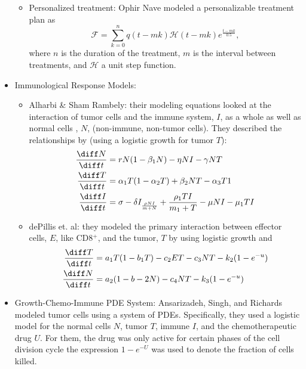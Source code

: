 \documentclass[11pt]{amsart}
\begin{document}
\begin{itemize}
\begin{itemize}
			\item Personalized treatment: Ophir Nave modeled a personalizable treatment plan as 
				\begin{equation}
					\mathscr{F} = \sum_{k=0}^n q(t-mk) \mathscr{H} (t-mk)e^{\frac{t-mk}{0.5}}\label{eq: NavePersonalChemo},
				\end{equation}
				where $n$ is the duration of the treatment, $m$ is the interval between treatments, and $\mathscr{H}$ a unit step function.
		\end{itemize}
	\item Immunological Response Models:
		\begin{itemize}
			\item Alharbi \& Sham Rambely: their modeling equations looked at the interaction of tumor cells and the immune system, $I$, as a whole as well as normal cells , $N$, (non-immune, non-tumor cells). They described the relationships by (using a logistic growth for tumor $T$):
				\begin{eqnarray}
					\begin{aligned}
						\frac{\diff N}{\diff t} &= rN(1-\beta_1 N) - \eta NI - \gamma NT \\
						\frac{\diff T}{\diff t} &= \alpha_1T(1-\alpha_2T) + \beta_2 NT - \alpha_3 T1 \\
						\frac{\diff I}{\diff t} &= \sigma - \delta I _ \frac{\rho N I}{m+N} + \frac{\rho_1 TI}{m_1 + T} - \mu NI - \mu_1 TI \label{eq: AlharbiTumorImmuno}
					\end{aligned}
				\end{eqnarray}
			\item dePillis et. al: they modeled the primary interaction between effector cells, $E$, like CD8$^+$, and the tumor, $T$ by using logistic growth and 
				\begin{eqnarray}
					\begin{aligned}
						\frac{\diff T}{\diff t} &= a_1T(1-b_1T) - c_2ET - c_3NT - k_2(1-e^{-u}) \\
						\frac{\diff N}{\diff t} &= a_2(1-b-2N) - c_4NT - k_3 (1-e^{-u})\label{eq: dePillisTumorImmuno}
					\end{aligned}
				\end{eqnarray}
		\end{itemize}
	\item Growth-Chemo-Immune PDE System: Ansarizadeh, Singh, and Richards modeled tumor cells using a system of PDEs. Specifically, they used a logistic model for the normal cells $N$, tumor $T$, immune $I$, and the chemotherapeutic drug $U$. For them, the drug was only active for certain phases of the cell division cycle the expression $1-e^{-U}$ was used to denote the fraction of cells killed.

\end{itemize}
\end{document}
